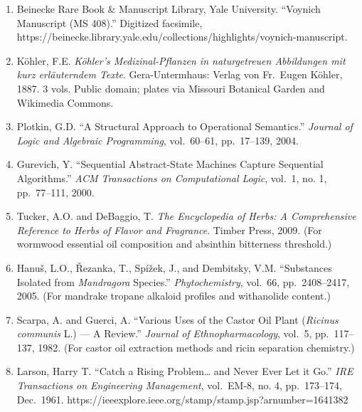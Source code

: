 \begin{enumerate}
\def\labelenumi{\arabic{enumi}.}
\item
  Beinecke Rare Book \& Manuscript Library, Yale University. ``Voynich
  Manuscript (MS 408).'' Digitized facsimile,
  https://beinecke.library.yale.edu/collections/highlights/voynich-manuscript.
\item
  Köhler, F.E. \emph{Köhler's Medizinal-Pflanzen in naturgetreuen
  Abbildungen mit kurz erläuterndem Texte}. Gera-Untermhaus: Verlag von
  Fr.~Eugen Köhler, 1887. 3 vols. Public domain; plates via Missouri
  Botanical Garden and Wikimedia Commons.
\item
  Plotkin, G.D. ``A Structural Approach to Operational Semantics.''
  \emph{Journal of Logic and Algebraic Programming}, vol.~60--61,
  pp.~17--139, 2004.
\item
  Gurevich, Y. ``Sequential Abstract-State Machines Capture Sequential
  Algorithms.'' \emph{ACM Transactions on Computational Logic}, vol.~1,
  no. 1, pp.~77--111, 2000.
\item
  Tucker, A.O. and DeBaggio, T. \emph{The Encyclopedia of Herbs: A
  Comprehensive Reference to Herbs of Flavor and Fragrance}. Timber
  Press, 2009. (For wormwood essential oil composition and absinthin
  bitterness threshold.)
\item
  Hanuš, L.O., Řezanka, T., Spížek, J., and Dembitsky, V.M. ``Substances
  Isolated from \emph{Mandragora} Species.'' \emph{Phytochemistry},
  vol.~66, pp.~2408--2417, 2005. (For mandrake tropane alkaloid profiles
  and withanolide content.)
\item
  Scarpa, A. and Guerci, A. ``Various Uses of the Castor Oil Plant
  (\emph{Ricinus communis} L.) --- A Review.'' \emph{Journal of
  Ethnopharmacology}, vol.~5, pp.~117--137, 1982. (For castor oil
  extraction methods and ricin separation chemistry.)
\item
  Larson, Harry T. ``Catch a Rising Problem\ldots{} and Never Ever Let
  it Go.'' \emph{IRE Transactions on Engineering Management}, vol.~EM-8,
  no. 4, pp.~173--174, Dec.~1961.
  https://ieeexplore.ieee.org/stamp/stamp.jsp?arnumber=1641382
\end{enumerate}

